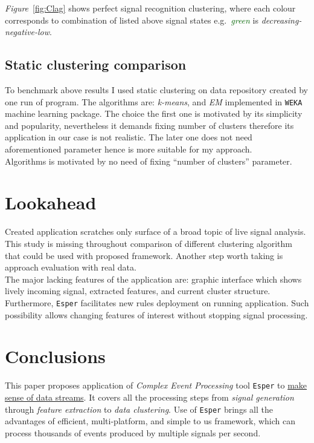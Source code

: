 \documentclass[11pt, letterpaper]{article}            %
\begin{document}
\emph{Figure}~\ref{fig:Clag} shows perfect signal recognition clustering, where each colour corresponds to combination of listed above signal states e.g.\ \emph{\textcolor{darkgreen}{green}} is \emph{decreasing-negative-low}.

\subsection{Static clustering comparison}
To benchmark above results I used static clustering on data repository created by one run of program. The algorithms are: \emph{k-means}, and \emph{EM} implemented in \texttt{WEKA} machine learning package. The choice the first one is motivated by its simplicity and popularity, nevertheless it demands fixing number of clusters therefore its application in our case is not realistic. The later one does not need aforementioned parameter hence is more suitable for my approach.\\
Algorithms is motivated by no need of fixing ``number of clusters'' parameter.\\

\section{Lookahead}
Created application scratches only surface of a broad topic of live signal analysis.\\
This study is missing throughout comparison of different clustering algorithm that could be used with proposed framework. Another step worth taking is approach evaluation with real data.\\

The major lacking features of the application are: graphic interface which shows lively incoming signal, extracted features, and current cluster structure.\\
Furthermore, \texttt{Esper} facilitates new rules deployment on running application. Such possibility allows changing features of interest without stopping signal processing.\\

\section{Conclusions}
This paper proposes application of \emph{Complex Event Processing} tool \texttt{Esper} to \underline{make sense of data streams}. It covers all the processing steps from \emph{signal generation} through \emph{feature extraction} to \emph{data clustering}. Use of \texttt{Esper} brings all the advantages of efficient, multi-platform, and simple to us framework, which can process thousands of events produced by multiple signals per second.\\
\end{document}
